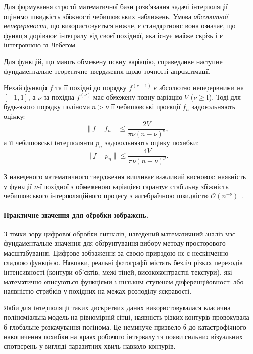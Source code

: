Для формування строгої математичної бази розв'язання задачі інтерполяції оцінимо швидкість збіжності чебишовських наближень. Умова \textit{абсолютної неперервності}, що використовується нижче, є стандартною: вона означає, що функція дорівнює інтегралу від своєї похідної, яка існує майже скрізь і є інтегровною за Лебегом.

Для функцій, що мають обмежену повну варіацію, справедливе наступне фундаментальне теоретичне твердження щодо точності апроксимації.

\begin{statement}
	\label{st:convergence_differentiable}
	Нехай функція $f$ та її похідні до порядку $f^{(\nu-1)}$ є абсолютно неперервними на $[-1, 1]$, а $\nu$-та похідна $f^{(\nu)}$ має обмежену повну варіацію $V$ ($\nu \ge 1$). Тоді для будь-якого порядку полінома $n > \nu$ її чебишовські проєкції $f_n$ задовольняють оцінку:
	\begin{equation}\label{eq:cheb_proj_bound}
		\|f - f_n\| \le \frac{2V}{\pi\nu(n-\nu)^\nu},
	\end{equation}
	а її чебишовські інтерполянти $p_n$ задовольняють оцінку похибки:
	\begin{equation}\label{eq:cheb_interp_bound}
		\|f - p_n\| \le \frac{4V}{\pi\nu(n-\nu)^\nu}.
	\end{equation}
\end{statement}

З наведеного математичного твердження випливає важливий висновок: наявність у функції $\nu$-ї похідної з обмеженою варіацією гарантує стабільну збіжність чебишовського інтерполяційного процесу з алгебраїчною швидкістю $\mathcal{O}(n^{-\nu})$~\cite{trefethen2013approximation}. 

\paragraph{Практичне значення для обробки зображень.}
З точки зору цифрової обробки сигналів, наведений математичний аналіз має фундаментальне значення для обґрунтування вибору методу просторового масштабування. Цифрове зображення за своєю природою не є нескінченно гладкою функцією. Навпаки, реальні фотографії містять безліч різких переходів інтенсивності (контури об'єктів, межі тіней, висококонтрастні текстури), які математично описуються функціями з низьким ступенем диференційовності або наявністю стрибків у похідних на межах розподілу яскравості.

Якби для інтерполяції таких дискретних даних використовувалася класична поліноміальна модель на рівномірній сітці, наявність різких контурів провокувала б глобальне розкачування полінома. Це неминуче призвело б до катастрофічного накопичення похибки на краях робочого інтервалу та появи сильних візуальних спотворень у вигляді паразитних хвиль навколо контурів.

